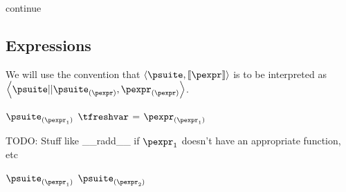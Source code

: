 \documentclass{article}
\begin{document}
\begin{mathpar}
\end{mathpar}

\newsavebox{\continueBox}
\begin{lrbox}{\continueBox}
\begin{python}
continue
\end{python}
\end{lrbox}

\begin{mathpar}
\end{mathpar}

\subsection{Expressions}

We will use the convention that $\left<\psuite, \meaningof{\pexpr}\right>$ is to be interpreted as
$\left<\psuite || \psuite_{(\pexpr)}, \pexpr_{(\pexpr)}\right>$.

\newsavebox{\andBox}
\begin{lrbox}{\andBox}
\begin{python}
$\psuite_{(\pexpr_1)}$
$\tfreshvar$ = $\pexpr_{(\pexpr_1)}$
\end{python}
\end{lrbox}

\begin{mathpar}
\end{mathpar}

\begin{mathpar}
\end{mathpar}

TODO: Stuff like \_\_radd\_\_ if $\pexpr_1$ doesn't have an appropriate function, etc

\newsavebox{\binopBox}
\begin{lrbox}{\binopBox}
\begin{python}
$\psuite_{(\pexpr_1)}$
$\psuite_{(\pexpr_2)}$
\end{python}
\end{lrbox}
\end{document}
